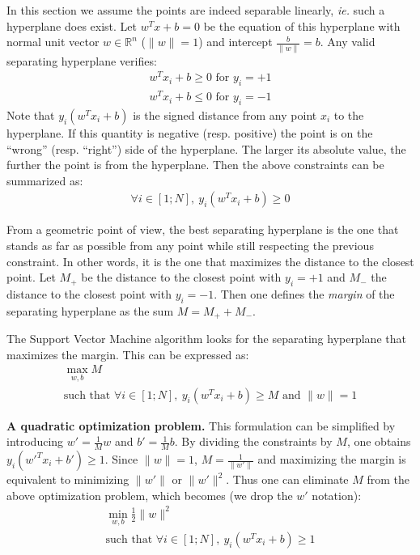 \documentclass{article}
\begin{document}
In this section we assume the points are indeed separable linearly, \emph{ie.} such a hyperplane does exist. Let $w^Tx+b = 0$ be the equation of this hyperplane with normal unit vector $w \in \mathbb{R}^n$ ($\|w\|=1$) and intercept $\frac{b}{\|w\|}=b$. Any valid separating hyperplane verifies:
\begin{align*}
w^Tx_i + b \geq 0 \text{ for } y_i=+1\\
w^Tx_i + b \leq 0 \text{ for } y_i=-1
\end{align*}
Note that $y_i\left( w^Tx_i + b \right)$ is the signed distance from any point $x_i$ to the hyperplane. If this quantity is negative (resp. positive) the point is on the ``wrong'' (resp. ``right'') side of the hyperplane. The larger its absolute value, the further the point is from the hyperplane. Then the above constraints can be summarized as:
\begin{align*}
\forall i \in [1;N], \ y_i\left( w^Tx_i + b \right) \geq 0
\end{align*}

From a geometric point of view, the best separating hyperplane is the one that stands as far as possible from any point while still respecting the previous constraint. In other words, it is the one that maximizes the distance to the closest point. Let $M_+$ be the distance to the closest point with $y_i=+1$ and $M_-$ the distance to the closest point with $y_i=-1$. Then one defines the \emph{margin} of the separating hyperplane as the sum $M=M_+ + M_-$.

The Support Vector Machine algorithm looks for the separating hyperplane that maximizes the margin. This can be expressed as:
\begin{gather*}
\max_{w,b} M\\
\text{such that } \forall i \in [1;N], \ y_i\left( w^Tx_i + b \right) \geq M \text{ and } \|w\| = 1
\end{gather*}

\textbf{A quadratic optimization problem.} 
This formulation can be simplified by introducing $w'= \frac{1}{M} w$ and $b'=\frac{1}{M} b$. By dividing the constraints by $M$, one obtains $y_i\left( w'^Tx_i + b' \right) \geq 1$. Since $\|w\|=1$, $M=\frac{1}{\|w'\|}$ and maximizing the margin is equivalent to minimizing $\|w'\|$ or $\|w'\|^2$. Thus one can eliminate $M$ from the above optimization problem, which becomes (we drop the $w'$ notation):
\begin{gather*}
\min_{w,b} \frac{1}{2} \|w\|^2 \\
\text{such that } \forall i \in [1;N], \ y_i\left( w^Tx_i + b \right) \geq 1
\end{gather*}
\end{document}

